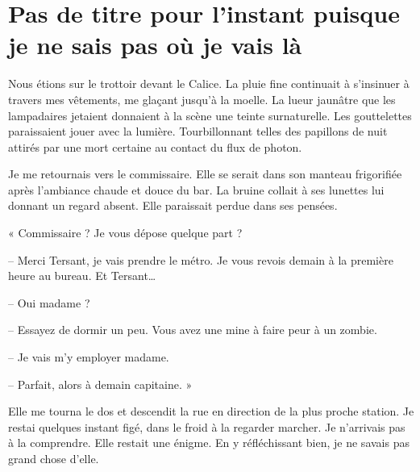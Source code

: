 \chapter{Pas de titre pour l'instant puisque je ne sais pas où je vais là}

Nous étions sur le trottoir devant le Calice. La pluie fine continuait à s'insinuer à travers mes vêtements, me glaçant
jusqu'à la moelle. La lueur jaunâtre que les lampadaires jetaient donnaient à la scène une teinte surnaturelle. Les
gouttelettes paraissaient jouer avec la lumière. Tourbillonnant telles des papillons de nuit attirés par une mort
certaine au contact du flux de photon.

Je me retournais vers le commissaire. Elle se serait dans son manteau frigorifiée après l'ambiance chaude et douce du
bar. La bruine collait à ses lunettes lui donnant un regard absent. Elle paraissait perdue dans ses pensées.

« Commissaire ? Je vous dépose quelque part ?

-- Merci Tersant, je vais prendre le métro. Je vous revois demain à la première heure au bureau. Et Tersant… 

-- Oui madame ?

-- Essayez de dormir un peu. Vous avez une mine à faire peur à un zombie.

-- Je vais m'y employer madame. 

-- Parfait, alors à demain capitaine. »

Elle me tourna le dos et descendit la rue en direction de la plus proche station. Je restai quelques instant figé, dans
le froid à la regarder marcher. Je n'arrivais pas à la comprendre. Elle restait une énigme. En y réfléchissant bien, je
ne savais pas grand chose d'elle.
